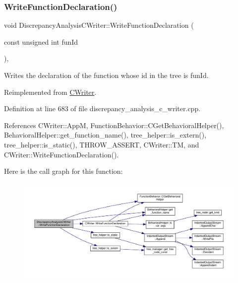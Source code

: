 \subsubsection{\texorpdfstring{Write\+Function\+Declaration()}{WriteFunctionDeclaration()}}
{\footnotesize\ttfamily void Discrepancy\+Analysis\+C\+Writer\+::\+Write\+Function\+Declaration (\begin{DoxyParamCaption}\item[{const unsigned int}]{fun\+Id }\end{DoxyParamCaption})\hspace{0.3cm}{\ttfamily [override]}, {\ttfamily [virtual]}}



Writes the declaration of the function whose id in the tree is fun\+Id. 



Reimplemented from \hyperlink{classCWriter_ad46d65f0cf64c09ce854032f15ffdd9e}{C\+Writer}.



Definition at line 683 of file discrepancy\+\_\+analysis\+\_\+c\+\_\+writer.\+cpp.



References C\+Writer\+::\+AppM, Function\+Behavior\+::\+C\+Get\+Behavioral\+Helper(), Behavioral\+Helper\+::get\+\_\+function\+\_\+name(), tree\+\_\+helper\+::is\+\_\+extern(), tree\+\_\+helper\+::is\+\_\+static(), T\+H\+R\+O\+W\+\_\+\+A\+S\+S\+E\+RT, C\+Writer\+::\+TM, and C\+Writer\+::\+Write\+Function\+Declaration().

Here is the call graph for this function\+:
\nopagebreak
\begin{figure}[H]
\begin{center}
\leavevmode
\includegraphics[width=350pt]{d4/d5c/classDiscrepancyAnalysisCWriter_a190bda3bc90a238e772d319afd83becc_cgraph}
\end{center}
\end{figure}
\mbox{\label{classDiscrepancyAnalysisCWriter_a544a8f99622f86cfbcc2eae9a83d4e64}} 
